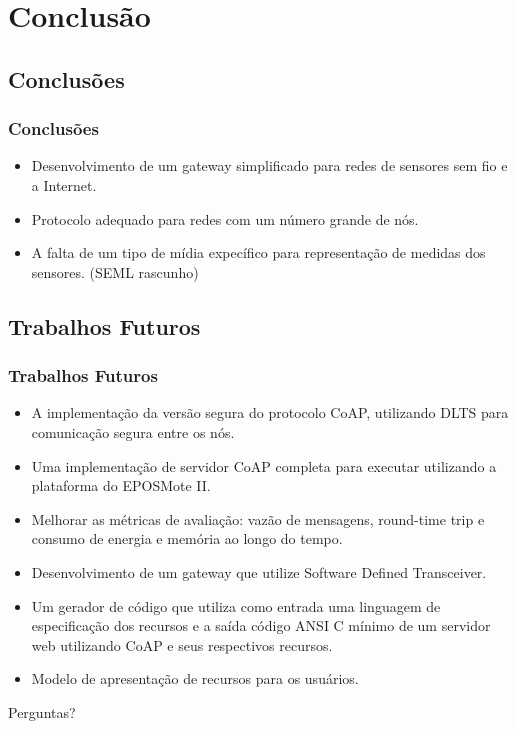 \documentclass{beamer}
\begin{document}
\section{Conclusão}

\subsection{Conclusões}
\begin{frame}
\frametitle{Conclusões}
\begin{itemize}
    \item Desenvolvimento de um gateway simplificado para redes de sensores sem fio e a Internet. 
    \item Protocolo adequado para redes com um número grande de nós.
    \item A falta de um tipo de mídia expecífico para representação de medidas dos sensores. (SEML rascunho)
\end{itemize}
\end{frame}
\subsection{Trabalhos Futuros}
\begin{frame}
\frametitle{Trabalhos Futuros}

\begin{itemize}
    \item A implementa\c{c}\~ao da vers\~ao segura do protocolo CoAP, utilizando DLTS para comunica\c{c}\~ao segura entre os n\'os.
    \item Uma implementa\c{c}\~ao de servidor CoAP completa para executar utilizando a plataforma do EPOSMote II.
    \item Melhorar as métricas de avaliação: vazão de mensagens, round-time trip e consumo de energia e memória ao longo do tempo.

    \item Desenvolvimento de um gateway que utilize Software Defined Transceiver.

    \item Um gerador de c\'odigo que utiliza como entrada uma linguagem de especifica\c{c}\~ao dos recursos e a sa\'ida c\'odigo ANSI C m\'inimo de um servidor web utilizando CoAP e seus respectivos recursos.

    \item Modelo de apresentação de recursos para os usuários.
\end{itemize}
\end{frame}

\begin{frame}
\Huge{\centerline{Perguntas?}}
\end{frame}

\end{document}

